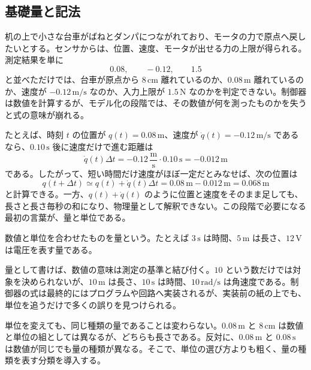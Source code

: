 \subsection{基礎量と記法}

机の上で小さな台車がばねとダンパにつながれており、モータの力で原点へ戻したいとする。センサからは、位置、速度、モータが出せる力の上限が得られる。測定結果を単に
\begin{equation}
  0.08,\qquad -0.12,\qquad 1.5
\end{equation}
と並べただけでは、台車が原点から $8\,\mathrm{cm}$ 離れているのか、$0.08\,\mathrm{m}$ 離れているのか、速度が $-0.12\,\mathrm{m/s}$ なのか、入力上限が $1.5\,\mathrm{N}$ なのかを判定できない。制御器は数値を計算するが、モデル化の段階では、その数値が何を測ったものかを失うと式の意味が崩れる。

たとえば、時刻 $t$ の位置が $q(t)=0.08\,\mathrm{m}$、速度が $\dot{q}(t)=-0.12\,\mathrm{m/s}$ であるなら、$0.10\,\mathrm{s}$ 後に速度だけで進む距離は
\begin{equation}
  \dot{q}(t)\Delta t
  =
  -0.12\,\frac{\mathrm{m}}{\mathrm{s}}\cdot0.10\,\mathrm{s}
  =
  -0.012\,\mathrm{m}
\end{equation}
である。したがって、短い時間だけ速度がほぼ一定だとみなせば、次の位置は
\begin{equation}
  q(t+\Delta t)\simeq q(t)+\dot{q}(t)\Delta t
  =0.08\,\mathrm{m}-0.012\,\mathrm{m}
  =0.068\,\mathrm{m}
\end{equation}
と計算できる。一方、$q(t)+\dot{q}(t)$ のように位置と速度をそのまま足しても、長さと長さ毎秒の和になり、物理量として解釈できない。この段階で必要になる最初の言葉が、量と単位である。

\begin{definition}[量と単位]
数値と単位を合わせたものを量という。たとえば $3\,\mathrm{s}$ は時間、$5\,\mathrm{m}$ は長さ、$12\,\mathrm{V}$ は電圧を表す量である。
\end{definition}

量として書けば、数値の意味は測定の基準と結び付く。$10$ という数だけでは対象を決められないが、$10\,\mathrm{m}$ は長さ、$10\,\mathrm{s}$ は時間、$10\,\mathrm{rad/s}$ は角速度である。制御器の式は最終的にはプログラムや回路へ実装されるが、実装前の紙の上でも、単位を追うだけで多くの誤りを見つけられる。

単位を変えても、同じ種類の量であることは変わらない。$0.08\,\mathrm{m}$ と $8\,\mathrm{cm}$ は数値と単位の組としては異なるが、どちらも長さである。反対に、$0.08\,\mathrm{m}$ と $0.08\,\mathrm{s}$ は数値が同じでも量の種類が異なる。そこで、単位の選び方よりも粗く、量の種類を表す分類を導入する。

